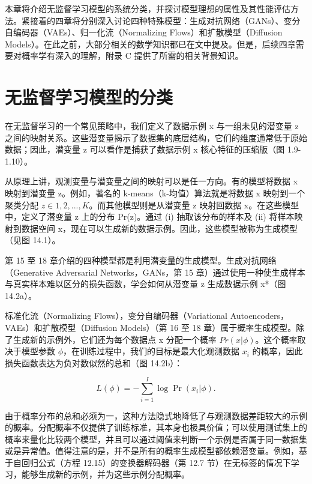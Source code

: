 \documentclass[lang=cn,newtx,10pt,scheme=chinese]{elegantbook}
\begin{document}
本章将介绍无监督学习模型的系统分类，并探讨模型理想的属性及其性能评估方法。紧接着的四章将分别深入讨论四种特殊模型：生成对抗网络（GANs）、变分自编码器（VAEs）、归一化流（Normalizing Flows）和扩散模型（Diffusion Models）。在此之前，大部分相关的数学知识都已在文中提及。但是，后续四章需要对概率学有深入的理解，附录 C 提供了所需的相关背景知识。

\section{无监督学习模型的分类}
在无监督学习的一个常见策略中，我们定义了数据示例 x 与一组未见的潜变量 z 之间的映射关系。这些潜变量揭示了数据集的底层结构，它们的维度通常低于原始数据；因此，潜变量 z 可以看作是捕获了数据示例 x 核心特征的压缩版（图 1.9-1.10）。

从原理上讲，观测变量与潜变量之间的映射可以是任一方向。有的模型将数据 x 映射到潜变量 z。例如，著名的 k-means（k-均值）算法就是将数据 x 映射到一个聚类分配 \(z \in {1,2,...,K}\)。而其他模型则是从潜变量 z 映射回数据 x。在这些模型中，定义了潜变量 z 上的分布 Pr(z)。通过 (i) 抽取该分布的样本及 (ii) 将样本映射到数据空间 x，现在可以生成新的数据示例。因此，这些模型被称为生成模型（见图 14.1）。

第 15 至 18 章介绍的四种模型都是利用潜变量的生成模型。生成对抗网络（Generative Adversarial Networks，GANs，第 15 章）通过使用一种使生成样本与真实样本难以区分的损失函数，学会如何从潜变量 z 生成数据示例 x*（图 14.2a）。

标准化流（Normalizing Flows），变分自编码器（Variational Autoencoders，VAEs）和扩散模型（Diffusion Models）（第 16 至 18 章）属于概率生成模型。除了生成新的示例外，它们还为每个数据点 x 分配一个概率 \(Pr(x|\phi)\)。这个概率取决于模型参数 \(\phi\)，在训练过程中，我们的目标是最大化观测数据 \(x_i\) 的概率，因此损失函数表达为负对数似然的总和（图 14.2b）：

\begin{equation}
L(\phi) = -\sum_{i=1}^{I} \log \Pr(x_i|\phi) .
\end{equation}

由于概率分布的总和必须为一，这种方法隐式地降低了与观测数据差距较大的示例的概率。分配概率不仅提供了训练标准，其本身也极具价值；可以使用测试集上的概率来量化比较两个模型，并且可以通过阈值来判断一个示例是否属于同一数据集或是异常值。值得注意的是，并不是所有的概率生成模型都依赖潜变量。例如，基于自回归公式（方程 12.15）的变换器解码器（第 12.7 节）在无标签的情况下学习，能够生成新的示例，并为这些示例分配概率。
\end{document}
